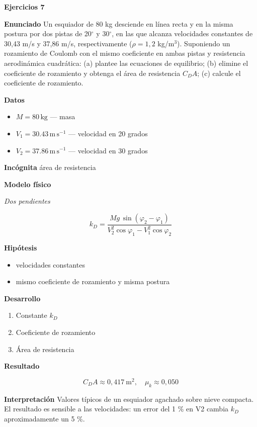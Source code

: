 \documentclass[10pt,openany]{book}
\begin{document}
\noindent\textbf{Ejercicios 7}

\noindent\textbf{Enunciado}
Un esquiador de 80 kg desciende en línea recta y en la misma postura por dos pistas de 20\(^\circ\) y 30\(^\circ\), en las que alcanza velocidades constantes de 30,43 m/s y 37,86 m/s, respectivamente (\(\rho = 1{,}2\) kg/m\(^3\)). Suponiendo un rozamiento de Coulomb con el mismo coeficiente en ambas pistas y resistencia aerodinámica cuadrática: (a) plantee las ecuaciones de equilibrio; (b) elimine el coeficiente de rozamiento y obtenga el área de resistencia \(C_D A\); (c) calcule el coeficiente de rozamiento.

\noindent\textbf{Datos}
\begin{itemize}
\item $M = 80\,\mathrm{kg}$ — masa
\item $V_{1} = 30.43\,\mathrm{m}\,\mathrm{s}^{-1}$ — velocidad en 20 grados
\item $V_{2} = 37.86\,\mathrm{m}\,\mathrm{s}^{-1}$ — velocidad en 30 grados
\end{itemize}

\noindent\textbf{Incógnita}
área de resistencia

\noindent\textbf{Modelo físico}

\noindent\textit{Dos pendientes}

\[
k_D = \frac{Mg\,\sin(\varphi_2 - \varphi_1)}{V_2^{2}\cos\varphi_1 - V_1^{2}\cos\varphi_2}
\]

\noindent\textbf{Hipótesis}
\begin{itemize}
\item velocidades constantes
\item mismo coeficiente de rozamiento y misma postura
\end{itemize}

\noindent\textbf{Desarrollo}
\begin{enumerate}
\item
Constante \(k_D\)
\item
Coeficiente de rozamiento
\item
Área de resistencia
\end{enumerate}

\noindent\textbf{Resultado}

\[
C_D A \approx 0{,}417\ \mathrm{m^{2}},\quad \mu_k \approx 0{,}050
\]

\noindent\textbf{Interpretación}
Valores típicos de un esquiador agachado sobre nieve compacta. El resultado es sensible a las velocidades: un error del 1 \% en V2 cambia \(k_D\) aproximadamente un 5 \%.
\end{document}
